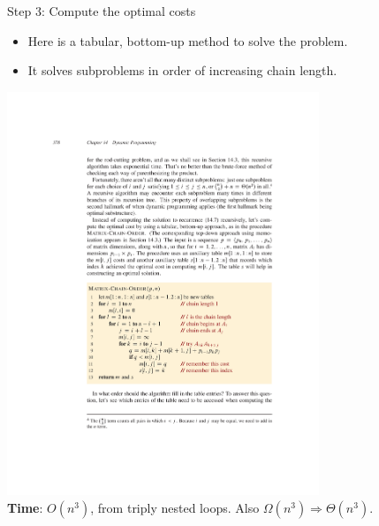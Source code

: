\documentclass[aspectratio=169]{beamer}
\begin{document}
\begin{frame}{Step 3: Compute the optimal costs}
    \begin{itemize}
        \item Here is a tabular, bottom-up method to solve the problem.
        \item It solves subproblems in order of increasing chain length.
    \end{itemize}
    \centering
    \includegraphics[width=0.7\textwidth, trim={5cm 7.5cm 4cm 13cm}, clip]{figures/p378} \\ \pause
    \textbf{Time}: $O(n^3)$, from triply nested loops. Also $\Omega (n^3) \Rightarrow \Theta (n^3)$.
\end{frame}
\end{document}
